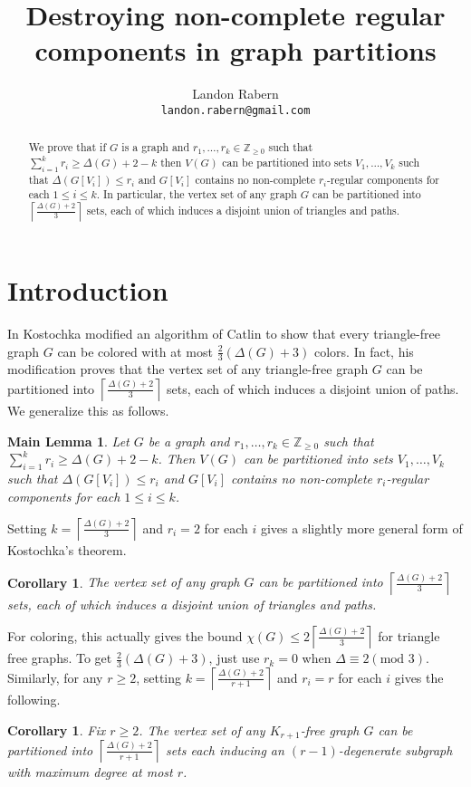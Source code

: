 \documentclass[12pt]{article}
\title{Destroying non-complete regular components in graph partitions}
\author{Landon Rabern\\
\small \texttt{landon.rabern@gmail.com}}
\theoremstyle{plain}
\newtheorem{cor}[thm]{Corollary}
\newtheorem*{MainLemma}{Main Lemma}
\theoremstyle{definition}
\theoremstyle{remark}
\begin{document}
\maketitle

\begin{abstract}
We prove that if $G$ is a graph and $r_1, \ldots, r_k \in \mathbb{Z}_{\geq 0}$ such that $\sum_{i=1}^k r_i \geq \Delta(G) + 2 - k$ then $V(G)$ can be partitioned into sets $V_1, \ldots, V_k$ such that $\Delta(G[V_i]) \leq r_i$ and $G[V_i]$ contains no non-complete $r_i$-regular components for each $1 \leq i \leq k$.  In particular, the vertex set of any graph $G$ can be partitioned into $\left \lceil \frac{\Delta(G) + 2}{3} \right \rceil$ sets, each of which induces a disjoint union of triangles and paths.
\end{abstract}

\section{Introduction}
In \cite{Kostochka} Kostochka modified an algorithm of Catlin to show that every triangle-free graph $G$ can be colored with at most $\frac{2}{3} \left (\Delta(G) + 3 \right)$ colors.  In fact, his modification proves that the vertex set of any triangle-free graph $G$ can be partitioned into $\left \lceil \frac{\Delta(G) + 2}{3} \right \rceil$ sets, each of which induces a disjoint union of paths. We generalize this as follows.

\begin{MainLemma}
Let $G$ be a graph and $r_1, \ldots, r_k \in \mathbb{Z}_{\geq 0}$ such that $\sum_{i=1}^k r_i \geq \Delta(G) + 2 - k$. Then $V(G)$ can be partitioned into sets $V_1, \ldots, V_k$ such that $\Delta(G[V_i]) \leq r_i$ and $G[V_i]$ contains no non-complete $r_i$-regular components for each $1 \leq i \leq k$.
\end{MainLemma}

\noindent Setting $k = \left \lceil \frac{\Delta(G) + 2}{3} \right \rceil$ and $r_i = 2$ for each $i$ gives a slightly more general form of Kostochka's theorem.

\begin{cor}
The vertex set of any graph $G$ can be partitioned into $\left \lceil \frac{\Delta(G) + 2}{3} \right \rceil$ sets, each of which induces a disjoint union of triangles and paths.
\end{cor}

For coloring, this actually gives the bound $\chi(G) \leq 2  \left \lceil \frac{\Delta(G) + 2}{3} \right \rceil$ for triangle free graphs.  To get $\frac{2}{3} \left (\Delta(G) + 3 \right)$, just use $r_k = 0$ when $\Delta \equiv 2 (\text{mod } 3)$. Similarly, for any $r \geq 2$, setting $k = \left \lceil \frac{\Delta(G) + 2}{r + 1} \right \rceil$ and $r_i = r$ for each $i$ gives the following.
\begin{cor}
Fix $r \geq 2$.  The vertex set of any $K_{r + 1}$-free graph $G$ can be partitioned into $\left \lceil \frac{\Delta(G) + 2}{r + 1} \right \rceil$ sets each inducing an $(r-1)$-degenerate subgraph with maximum degree at most $r$.
\end{cor}
\end{document}
